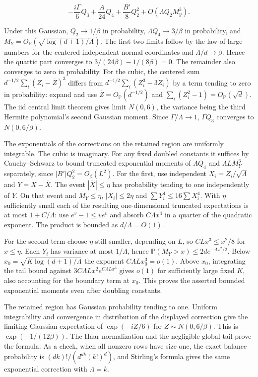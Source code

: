 \begin{equation*}
-\frac{i\Gamma}{6}Q_3+\frac A{24}Q_4+\frac{B'}8 Q_2^2
+O(\Lambda Q_2M_y^3).
\end{equation*}

Under this Gaussian, $Q_2\to1/\beta$ in probability, $\Lambda Q_4\to3/\beta$ in probability, and $M_Y=O_{\mathbb P}(\sqrt{\log(d+1)/\Lambda})$. The first two limits follow by the law of large numbers for the centered independent normal coordinates and $\Lambda/d\to\beta$. Hence the quartic part converges to $3/(24\beta)-1/(8\beta)=0$. The remainder also converges to zero in probability. For the cubic, the centered sum $d^{-1/2}\sum_i(Z_i-\overline Z)^3$ differs from $d^{-1/2}\sum_i(Z_i^3-3Z_i)$ by a term tending to zero in probability: expand and use $\overline Z=O_{\mathbb P}(d^{-1/2})$ and $\sum_i(Z_i^2-1)=O_{\mathbb P}(\sqrt d)$. The iid central limit theorem gives limit $N(0,6)$, the variance being the third Hermite polynomial's second Gaussian moment. Since $\Gamma/\Lambda\to1$, $\Gamma Q_3$ converges to $N(0,6/\beta)$.

The exponentials of the corrections on the retained region are uniformly integrable. The cubic is imaginary. For any fixed doubled constants it suffices by Cauchy--Schwarz to bound truncated exponential moments of $\Lambda Q_4$ and $\Lambda L M_Y^3$ separately, since $|B'|Q_2^2=O_\beta(L^2)$. For the first, use independent $X_i=Z_i/\sqrt\Lambda$ and $Y=X-\overline X$. The event $|\overline X|\le\eta$ has probability tending to one independently of $Y$. On that event and $M_Y\le\eta$, $|X_i|\le2\eta$ and $\sum Y_i^4\le16\sum X_i^4$. With $\eta$ sufficiently small each of the resulting one-dimensional truncated expectations is at most $1+C/\Lambda$: use $e^v-1\le ve^v$ and absorb $C\Lambda x^4$ in a quarter of the quadratic exponent. The product is bounded as $d/\Lambda=O(1)$.

For the second term choose $\eta$ still smaller, depending on $L$, so $C L x^3\le x^2/8$ for $x\le\eta$. Each $Y_i$ has variance at most $1/\Lambda$, hence $\mathbb P(M_Y>x)\le2d e^{-\Lambda x^2/2}$. Below $x_0=\sqrt{K\log(d+1)/\Lambda}$ the exponent $C\Lambda L x_0^3=o(1)$. Above $x_0$, integrating the tail bound against $3 C\Lambda L x^2 e^{C\Lambda L x^3}$ gives $o(1)$ for sufficiently large fixed $K$, also accounting for the boundary term at $x_0$. This proves the asserted bounded exponential moments even after doubling constants.

The retained region has Gaussian probability tending to one. Uniform integrability and convergence in distribution of the displayed correction give the limiting Gaussian expectation of $\exp(-iZ/6)$ for $Z\sim N(0,6/\beta)$. This is $\exp(-1/(12\beta))$. The Haar normalization and the negligible global tail prove the formula. As a check, when all nonzero rows have size one, the exact balance probability is $(dk)!/(d^{dk}(k!)^d)$, and Stirling's formula gives the same exponential correction with $\Lambda=k$.
